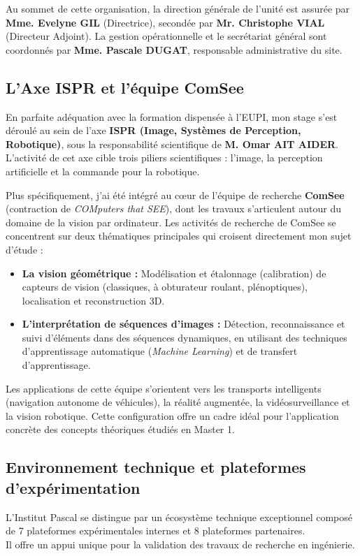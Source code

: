 \documentclass[12pt,a4paper,oneside]{report}
\begin{document}
Au sommet de cette organisation, la direction générale de l'unité est assurée par \textbf{Mme. Evelyne GIL} (Directrice), secondée par \textbf{Mr. Christophe VIAL} (Directeur Adjoint). La gestion opérationnelle et le secrétariat général sont coordonnés par \textbf{Mme. Pascale DUGAT}, responsable administrative du site.

\subsection{L'Axe ISPR et l'équipe ComSee}
En parfaite adéquation avec la formation dispensée à l'EUPI, mon stage s'est déroulé au sein de l'axe \textbf{ISPR (Image, Systèmes de Perception, Robotique)}, sous la responsabilité scientifique de \textbf{M. Omar AIT AIDER}. L'activité de cet axe cible trois piliers scientifiques : l'image, la perception artificielle et la commande pour la robotique. 

Plus spécifiquement, j'ai été intégré au cœur de l'équipe de recherche \textbf{ComSee} (contraction de \textit{COMputers that SEE}), dont les travaux s'articulent autour du domaine de la vision par ordinateur. Les activités de recherche de ComSee se concentrent sur deux thématiques principales qui croisent directement mon sujet d'étude :
\begin{itemize}[label=\textbullet]
    \item \textbf{La vision géométrique :} Modélisation et étalonnage (calibration) de capteurs de vision (classiques, à obturateur roulant, plénoptiques), localisation et reconstruction 3D.
    \item \textbf{L'interprétation de séquences d'images :} Détection, reconnaissance et suivi d'éléments dans des séquences dynamiques, en utilisant des techniques d'apprentissage automatique (\textit{Machine Learning}) et de transfert d'apprentissage.
\end{itemize}

Les applications de cette équipe s'orientent vers les transports intelligents (navigation autonome de véhicules), la réalité augmentée, la vidéosurveillance et la vision robotique. Cette configuration offre un cadre idéal pour l'application concrète des concepts théoriques étudiés en Master 1.

\subsection{Environnement technique et plateformes d'expérimentation}
L'Institut Pascal se distingue par un écosystème technique exceptionnel composé de 7 plateformes expérimentales internes et 8 plateformes partenaires.\\
Il offre un appui unique pour la validation des travaux de recherche en ingénierie.\\
\end{document}
